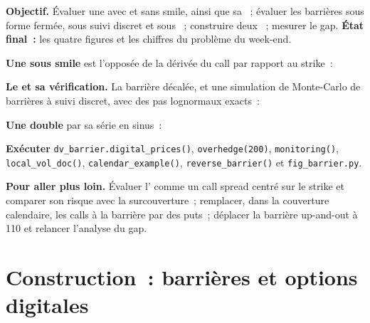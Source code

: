 \begin{tutorial}
\textbf{Objectif.} Évaluer une  avec et sans smile, ainsi que sa ~; évaluer les barrières sous forme fermée,
sous suivi discret et sous ~; construire deux ~; mesurer le gap. \textbf{État final~:} les
quatre figures et les chiffres du problème du week-end.
\begin{tutsteps}
\item \textbf{Une  sous smile} est l'opposée de la dérivée du call par rapport au strike~:
\label{lst:dv:barriers-and-digitals:digital}
\item \textbf{Le  et sa vérification.} La barrière décalée, et une simulation de Monte-Carlo de barrières
à suivi discret, avec des pas lognormaux exacts~:
\label{lst:dv:barriers-and-digitals:shift}
\item \textbf{Une  double} par sa série en sinus~:
\label{lst:dv:barriers-and-digitals:dnt}
\item \textbf{Exécuter} \texttt{dv\_barrier.digital\_prices()}, \texttt{overhedge(200)}, \texttt{monitoring()},
\texttt{local\_vol\_doc()}, \texttt{calendar\_example()}, \texttt{reverse\_barrier()} et \texttt{fig\_barrier.py}.
\end{tutsteps}
\textbf{Pour aller plus loin.} Évaluer l' comme un call spread centré sur le strike et comparer son risque avec la
surcouverture~; remplacer, dans la couverture calendaire, les calls à la barrière par des puts~; déplacer la barrière up-and-out à 110 et relancer
l'analyse du gap.
\end{tutorial}

\section{Construction~: barrières et options digitales}\label{bld:dv:barriers-and-digitals:barrier}

